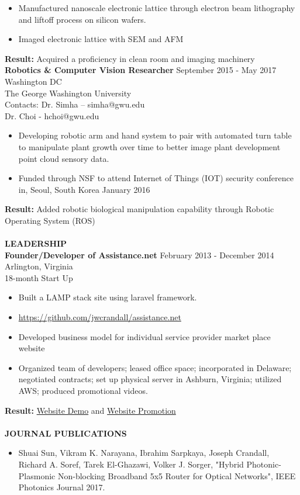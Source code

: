 \begin{singlespace}
\begin{itemize}
	\item Manufactured nanoscale electronic lattice through electron beam lithography and liftoff process on silicon wafers.
	\item Imaged electronic lattice with SEM and AFM
\end{itemize}
\textbf{Result:} Acquired a proficiency in clean room and imaging machinery\\
\textbf{Robotics \& Computer Vision Researcher} \hfill September 2015 - May 2017\\
Washington DC\\
The George Washington University\\
Contacts: Dr. Simha – simha@gwu.edu\\
Dr. Choi - hchoi@gwu.edu
\begin{itemize}
	\item Developing robotic arm and hand system to pair with automated turn table to manipulate plant growth over time to better image plant development point cloud sensory data.
	\item Funded through NSF to attend Internet of Things (IOT) security conference in, Seoul, South Korea January 2016
\end{itemize}
\textbf{Result:} Added robotic biological manipulation capability through Robotic Operating System (ROS)
\\\\
\textbf{LEADERSHIP}\\
\textbf{Founder/Developer of Assistance.net} \hfill February 2013 - December 2014\\
Arlington, Virginia\\
18-month Start Up\\
\begin{itemize}
	\item Built a LAMP stack site using laravel framework.
	\item \url{https://github.com/jwcrandall/assistance.net}
	\item Developed business model for individual service provider market place website
	\item Organized team of developers; leased office space; incorporated in Delaware; negotiated contracts; set up physical server in Ashburn, Virginia; utilized AWS; produced promotional videos. 
\end{itemize}
\textbf{Result: } \href{https://www.youtube.com/watch?v=-9OBGa0BQKc&t=5s}{Website Demo} and \href{https://www.youtube.com/watch?v=kAH-ZZvkxP8&t=1s}{Website Promotion}
\\\\
\textbf{JOURNAL PUBLICATIONS}
\begin{itemize}
	\item Shuai Sun, Vikram K. Narayana, Ibrahim Sarpkaya, Joseph Crandall, Richard A. Soref, Tarek El-Ghazawi, Volker J. Sorger, "Hybrid Photonic-Plasmonic Non-blocking Broadband 5x5 Router for Optical Networks", IEEE Photonics Journal 2017.
\end{itemize}


\end{singlespace}

